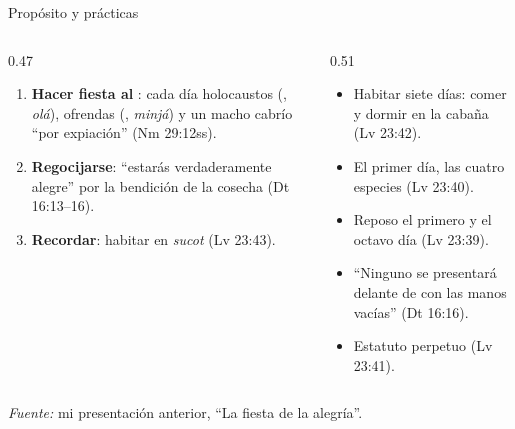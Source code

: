 \begin{frame}{Propósito y prácticas}
\begin{columns}[t,onlytextwidth]
\begin{column}{0.47\textwidth}
\par\smallskip\scriptsize\RaggedRight
\begin{enumerate}
\item \textbf{Hacer fiesta al \SENOR}: cada día holocaustos (, \emph{olá}), ofrendas (, \emph{minjá}) y un macho cabrío ``por expiación'' (Nm 29:12ss).
\item \textbf{Regocijarse}: ``estarás verdaderamente alegre'' por la bendición de la cosecha (Dt 16:13--16).
\item \textbf{Recordar}: habitar en \emph{sucot} (Lv 23:43).
\end{enumerate}
\end{column}
\begin{column}{0.51\textwidth}
\par\smallskip\scriptsize\RaggedRight
\begin{itemize}
\item Habitar siete días: comer y dormir en la cabaña (Lv 23:42).
\item El primer día, las cuatro especies (Lv 23:40).
\item Reposo el primero y el octavo día (Lv 23:39).
\item ``Ninguno se presentará delante de \SENOR{} con las manos vacías'' (Dt 16:16).
\item Estatuto perpetuo (Lv 23:41).
\end{itemize}
\end{column}
\end{columns}\par\medskip
{\fontsize{6}{7}\selectfont\color{sepia}\textit{Fuente:} mi presentación anterior, ``La fiesta de la alegría''.}\par
{}
\end{frame}

